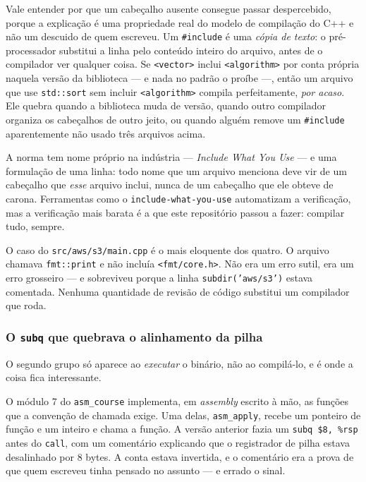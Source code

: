 Vale entender por que um cabeçalho ausente consegue passar despercebido, porque
a explicação é uma propriedade real do modelo de compilação do C++ e não um
descuido de quem escreveu. Um \texttt{\#include} é uma \emph{cópia de texto}:
o pré-processador substitui a linha pelo conteúdo inteiro do arquivo, antes de
o compilador ver qualquer coisa. Se \texttt{<vector>} inclui \texttt{<algorithm>}
por conta própria naquela versão da biblioteca --- e nada no padrão o proíbe
---, então um arquivo que use \texttt{std::sort} sem incluir
\texttt{<algorithm>} compila perfeitamente, \emph{por acaso}. Ele quebra quando
a biblioteca muda de versão, quando outro compilador organiza os cabeçalhos de
outro jeito, ou quando alguém remove um \texttt{\#include} aparentemente não
usado três arquivos acima.

\begin{regra}
A norma tem nome próprio na indústria --- \emph{Include What You Use} --- e uma
formulação de uma linha: todo nome que um arquivo menciona deve vir de um
cabeçalho que \emph{esse} arquivo inclui, nunca de um cabeçalho que ele obteve
de carona. Ferramentas como o \texttt{include-what-you-use} automatizam a
verificação, mas a verificação mais barata é a que este repositório passou a
fazer: compilar tudo, sempre.
\end{regra}

O caso do \texttt{src/aws/s3/main.cpp} é o mais eloquente dos quatro. O arquivo
chamava \texttt{fmt::print} e não incluía \texttt{<fmt/core.h>}. Não era um erro
sutil, era um erro grosseiro --- e sobreviveu porque a linha \texttt{subdir('aws/s3')} estava comentada. Nenhuma quantidade de revisão de código
substitui um compilador que roda.

\subsubsection{O \texttt{subq} que quebrava o alinhamento da pilha}

O segundo grupo só aparece ao \emph{executar} o binário, não ao compilá-lo, e é
onde a coisa fica interessante.

O módulo 7 do \texttt{asm\_course} implementa, em \emph{assembly} escrito à mão,
as funções que a convenção de chamada exige. Uma delas, \texttt{asm\_apply},
recebe um ponteiro de função e um inteiro e chama a função. A versão anterior
fazia um \texttt{subq \$8, \%rsp} antes do \texttt{call}, com um comentário
explicando que o registrador de pilha estava desalinhado por 8 bytes. A conta
estava invertida, e o comentário era a prova de que quem escreveu tinha pensado
no assunto --- e errado o sinal.

